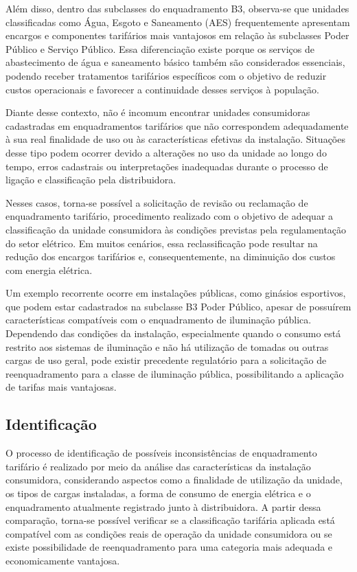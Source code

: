 \documentclass[12pt,a4paper]{article}
\begin{document}
Além disso, dentro das subclasses do enquadramento B3, observa-se que unidades classificadas como Água, Esgoto e Saneamento (AES) frequentemente apresentam encargos e componentes tarifários mais vantajosos em relação às subclasses Poder Público e Serviço Público. Essa diferenciação existe porque os serviços de abastecimento de água e saneamento básico também são considerados essenciais, podendo receber tratamentos tarifários específicos com o objetivo de reduzir custos operacionais e favorecer a continuidade desses serviços à população.

Diante desse contexto, não é incomum encontrar unidades consumidoras cadastradas em enquadramentos tarifários que não correspondem adequadamente à sua real finalidade de uso ou às características efetivas da instalação. Situações desse tipo podem ocorrer devido a alterações no uso da unidade ao longo do tempo, erros cadastrais ou interpretações inadequadas durante o processo de ligação e classificação pela distribuidora.

Nesses casos, torna-se possível a solicitação de revisão ou reclamação de enquadramento tarifário, procedimento realizado com o objetivo de adequar a classificação da unidade consumidora às condições previstas pela regulamentação do setor elétrico. Em muitos cenários, essa reclassificação pode resultar na redução dos encargos tarifários e, consequentemente, na diminuição dos custos com energia elétrica.

Um exemplo recorrente ocorre em instalações públicas, como ginásios esportivos, que podem estar cadastrados na subclasse B3 Poder Público, apesar de possuírem características compatíveis com o enquadramento de iluminação pública. Dependendo das condições da instalação, especialmente quando o consumo está restrito aos sistemas de iluminação e não há utilização de tomadas ou outras cargas de uso geral, pode existir precedente regulatório para a solicitação de reenquadramento para a classe de iluminação pública, possibilitando a aplicação de tarifas mais vantajosas.

\subsection{Identificação}

O processo de identificação de possíveis inconsistências de enquadramento tarifário é realizado por meio da análise das características da instalação consumidora, considerando aspectos como a finalidade de utilização da unidade, os tipos de cargas instaladas, a forma de consumo de energia elétrica e o enquadramento atualmente registrado junto à distribuidora. A partir dessa comparação, torna-se possível verificar se a classificação tarifária aplicada está compatível com as condições reais de operação da unidade consumidora ou se existe possibilidade de reenquadramento para uma categoria mais adequada e economicamente vantajosa.
\end{document}

